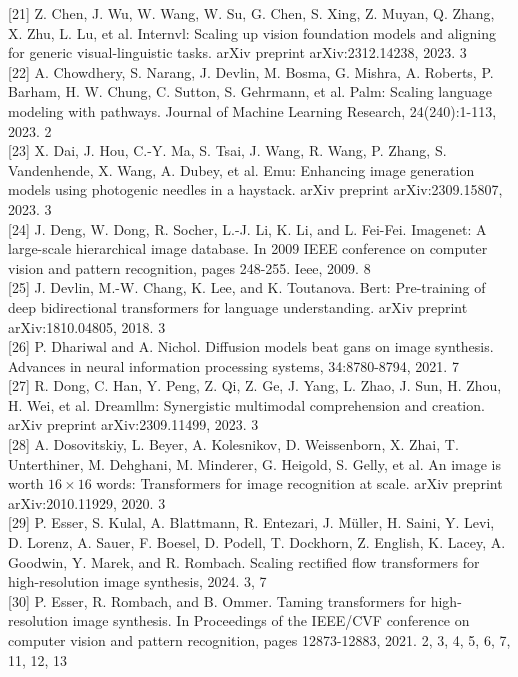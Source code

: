 \documentclass{article}
\begin{document}
[21] Z. Chen, J. Wu, W. Wang, W. Su, G. Chen, S. Xing, Z. Muyan, Q. Zhang, X. Zhu, L. Lu, et al. Internvl: Scaling up vision foundation models and aligning for generic visual-linguistic tasks. arXiv preprint arXiv:2312.14238, 2023. 3\\[0pt]
[22] A. Chowdhery, S. Narang, J. Devlin, M. Bosma, G. Mishra, A. Roberts, P. Barham, H. W. Chung, C. Sutton, S. Gehrmann, et al. Palm: Scaling language modeling with pathways. Journal of Machine Learning Research, 24(240):1-113, 2023. 2\\[0pt]
[23] X. Dai, J. Hou, C.-Y. Ma, S. Tsai, J. Wang, R. Wang, P. Zhang, S. Vandenhende, X. Wang, A. Dubey, et al. Emu: Enhancing image generation models using photogenic needles in a haystack. arXiv preprint arXiv:2309.15807, 2023. 3\\[0pt]
[24] J. Deng, W. Dong, R. Socher, L.-J. Li, K. Li, and L. Fei-Fei. Imagenet: A large-scale hierarchical image database. In 2009 IEEE conference on computer vision and pattern recognition, pages 248-255. Ieee, 2009. 8\\[0pt]
[25] J. Devlin, M.-W. Chang, K. Lee, and K. Toutanova. Bert: Pre-training of deep bidirectional transformers for language understanding. arXiv preprint arXiv:1810.04805, 2018. 3\\[0pt]
[26] P. Dhariwal and A. Nichol. Diffusion models beat gans on image synthesis. Advances in neural information processing systems, 34:8780-8794, 2021. 7\\[0pt]
[27] R. Dong, C. Han, Y. Peng, Z. Qi, Z. Ge, J. Yang, L. Zhao, J. Sun, H. Zhou, H. Wei, et al. Dreamllm: Synergistic multimodal comprehension and creation. arXiv preprint arXiv:2309.11499, 2023. 3\\[0pt]
[28] A. Dosovitskiy, L. Beyer, A. Kolesnikov, D. Weissenborn, X. Zhai, T. Unterthiner, M. Dehghani, M. Minderer, G. Heigold, S. Gelly, et al. An image is worth $16 \times 16$ words: Transformers for image recognition at scale. arXiv preprint arXiv:2010.11929, 2020. 3\\[0pt]
[29] P. Esser, S. Kulal, A. Blattmann, R. Entezari, J. Müller, H. Saini, Y. Levi, D. Lorenz, A. Sauer, F. Boesel, D. Podell, T. Dockhorn, Z. English, K. Lacey, A. Goodwin, Y. Marek, and R. Rombach. Scaling rectified flow transformers for high-resolution image synthesis, 2024. 3, 7\\[0pt]
[30] P. Esser, R. Rombach, and B. Ommer. Taming transformers for high-resolution image synthesis. In Proceedings of the IEEE/CVF conference on computer vision and pattern recognition, pages 12873-12883, 2021. 2, 3, 4, 5, 6, 7, 11, 12, 13\\[0pt]
\end{document}
